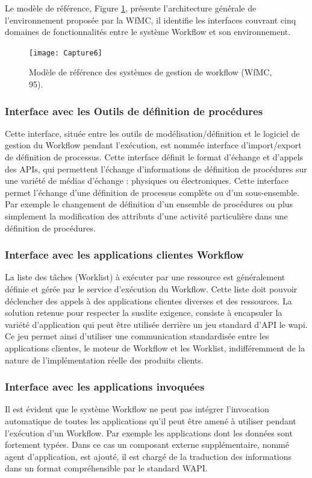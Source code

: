 Le modèle de référence, Figure \ref{fig:capture6}, présente l’architecture générale de l’environnement
proposée par la WfMC, il identifie les interfaces couvrant cinq domaines de fonctionnalités entre le système Workflow et son environnement. 

\begin{figure}[h]
	\centering
	\texttt{[image: Capture6]}
	\caption{ Modèle de référence des systèmes de gestion de workflow (WfMC, 95). }
	\label{fig:capture6}
\end{figure}


\subsubsection{Interface avec les Outils de définition de procédures }
Cette interface, située entre les outils de modélisation/définition et le logiciel de gestion
du Workflow pendant l’exécution, est nommée interface d’import/export de définition de processus. Cette interface définit le format d’échange et d’appels des APIs, qui permettent
l'échange d'informations de définition de procédures sur une variété de médias d'échange :
physiques ou électroniques. Cette interface permet l'échange d'une définition de processus
complète ou d’un sous-ensemble. Par exemple le changement de définition d’un ensemble de
procédures ou plus simplement la modification des attributs d'une activité particulière dans
une définition de procédures. 

\subsubsection{Interface avec les applications clientes Workflow }
La liste des tâches (Worklist) à exécuter par une ressource est généralement définie et gérée par le service d’exécution du Workflow. Cette liste doit pouvoir déclencher des appels à
des applications clientes diverses et des ressources. La solution retenue pour respecter la susdite exigence, consiste à encapsuler la variété d’application qui peut être utilisée derrière un jeu standard d'API le \ac{wapi}. Ce jeu permet ainsi d’utiliser une communication standardisée entre les applications clientes, le moteur de Workflow et les Worklist, indifféremment de la nature de l’implémentation réelle des produits
clients. 
\subsubsection{Interface avec les applications invoquées}
Il est évident que le système Workflow ne peut pas intégrer l’invocation automatique de
toutes les applications qu’il peut être amené à utiliser pendant l’exécution d’un Workflow. Par
exemple les applications dont les données sont fortement typées. Dans ce cas un composant
externe supplémentaire, nommé agent d’application, est ajouté, il est chargé de la traduction
des informations dans un format compréhensible par le standard WAPI. 

